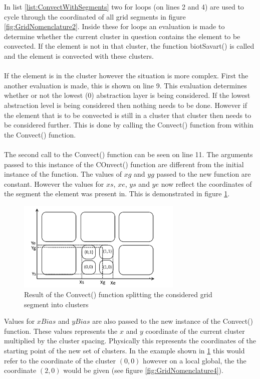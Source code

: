 In list \ref{list:ConvectWithSegments} two for loops (on lines 2 and 4) are used to cycle through the coordinated of all grid segments in figure \ref{fig:GridNomenclature2}. Inside these for loops an evaluation is made to determine whether the current cluster in question contains the element to be convected. If the element is not in that cluster, the function biotSavart() is called and the element is convected with these clusters.
\\\\
If the element is in the cluster however the situation is more complex. First the another evaluation is made, this is shown on line 9. This evaluation determines whether or not the lowest (0) abstraction layer is being considered. If the lowest abstraction level is being considered then nothing needs to be done. However if the element that is to be convected is still in a cluster that cluster then needs to be considered further. This is done by calling the Convect() function from within the Convect() function.
\\\\
The second call to the Convect() function can be seen on  line 11. The arguments passed to this instance of the COnvect() function are different from the initial instance of the function. The values of $xg$ and $yg$ passed to the new function are constant. However the values for $xs$, $xe$, $ys$ and $ye$ now reflect the coordinates of the segment the element was present in. This is demonstrated in figure \ref{fig:GridNomenclature3}.

\begin{figure}[H]
\centering
\includegraphics[width=0.7\textwidth]{Figures/AbstractionGridExample3.png}
\caption{\label{fig:GridNomenclature3} Result of the Convect() function splitting the considered grid segment into clusters}
\end{figure} 

Values for $xBias$ and $yBias$ are also passed to the new instance of the Convect() function. These values represents the $x$ and $y$ coordinate of the current cluster multiplied by the cluster spacing. Physically this represents the coordinates of the starting point of the new set of clusters. In the example shown in \ref{fig:GridNomenclature3} this would refer to the coordinate of the cluster $(0,0)$ however on a local global, the the coordinate $(2,0)$ would be given (see figure \ref{fig:GridNomenclature4}). 

